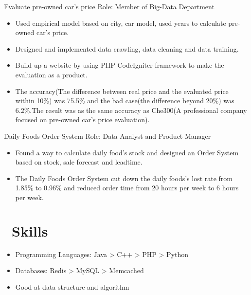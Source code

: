 \documentclass{resume}
\begin{document}
Evaluate pre-owned car's price
\newline Role: Member of Big-Data Department
\begin{itemize}
  \item Used empirical model based on city, car model, used years to calculate pre-owned car's price.
  \item Designed and implemented data crawling, data cleaning and data training.
  \item Build up a website by using PHP CodeIgniter framework to make the evaluation as a product.
  \item The accuracy(The difference between real price and the evaluated price within 10\%) was 75.5\% and the bad case(the difference beyond 20\%) was 6.2\%.The result was as the same accuracy as Che300(A professional company focused on pre-owned car's price evaluation).
\end{itemize}

Daily Foods Order System
\newline Role: Data Analyst and Product Manager
\begin{itemize}
  \item Found a way to calculate daily food’s stock and designed an Order System based on stock, sale forecast and leadtime.
  \item The Daily Foods Order System cut down the daily foods's lost rate from 1.85\% to 0.96\% and reduced order time from 20 hours per week to 6 hours per week.
\end{itemize}

\section{\faCogs\ Skills}
\begin{itemize}[parsep=0.5ex]
  \item Programming Languages: Java > C++ > PHP > Python
  \item Databases: Redis > MySQL > Memcached
  \item Good at data structure and algorithm
\end{itemize}
\end{document}
